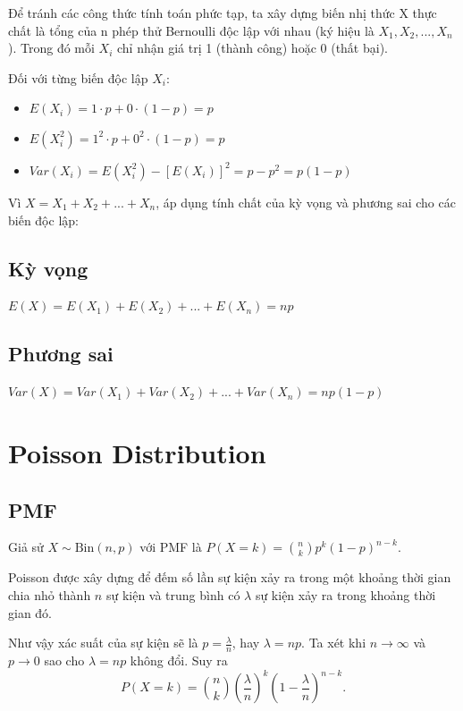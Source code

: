 Để tránh các công thức tính toán phức tạp, ta xây dựng biến nhị thức X thực chất là tổng của n phép thử Bernoulli độc lập với nhau (ký hiệu là $X_1, X_2,..., X_n$).
Trong đó mỗi $X_i$ chỉ nhận giá trị 1 (thành công) hoặc 0 (thất bại).

Đối với từng biến độc lập $X_i$:
\begin{itemize}
	\item $E(X_i) = 1\cdot p + 0\cdot(1-p) = p$
	\item $E(X^2_i) = 1^2\cdot p + 0^2\cdot(1-p) = p$
	\item $Var(X_i) = E(X^2_i) - [E(X_i)]^2 = p - p^2 = p(1-p)$
\end{itemize}

Vì $X = X_1+X_2+...+X_n$, áp dụng tính chất của kỳ vọng và phương sai cho các biến độc lập:
\subsection*{Kỳ vọng}
$E(X)=E(X_1)+E(X_2)+...+E(X_n)=np$
\subsection*{Phương sai}
$Var(X)=Var(X_1)+Var(X_2)+...+Var(X_n)=np(1-p)$

\section{Poisson Distribution}
\label{sec:Proof_Poisson}

\subsection*{PMF}
Giả sử $X \sim \mathrm{Bin}(n,p)$ với PMF là $P(X=k) = \binom{n}{k}p^k(1-p)^{n-k}.$

Poisson được xây dựng để đếm số lần sự kiện xảy ra trong một khoảng thời gian chia nhỏ thành $n$ sự kiện và trung bình có $\lambda$ sự kiện xảy ra trong khoảng thời gian đó.

Như vậy xác suất của sự kiện sẽ là $p=\frac{\lambda}{n}$, hay $\lambda=np$.
Ta xét khi $n\rightarrow\infty$ và $p\rightarrow 0$ sao cho $\lambda=np$ không đổi.
Suy ra
\[
P(X=k)
=
\binom{n}{k}
\left(\frac{\lambda}{n}\right)^k
\left(1-\frac{\lambda}{n}\right)^{n-k}.
\]

